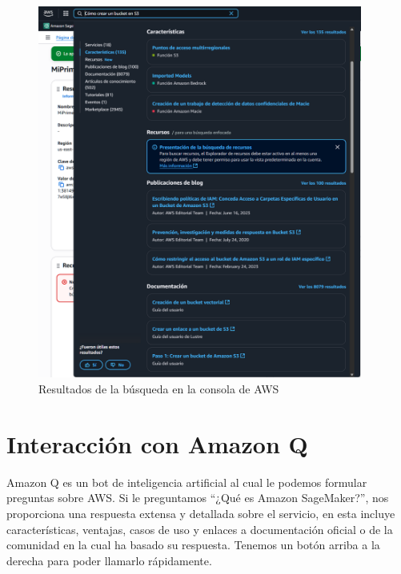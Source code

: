 \documentclass{article}
\begin{document}
	\begin{figure}[h!]
	\centering
	\includegraphics[width=0.95\textwidth]{tarea_5.png}
	\caption{Resultados de la búsqueda en la consola de AWS}
	\end{figure}

	\newpage

	\section{Interacción con Amazon Q}

	Amazon Q es un bot de inteligencia artificial al cual le podemos formular preguntas sobre AWS. Si le preguntamos ``¿Qué es Amazon SageMaker?'', nos proporciona una respuesta extensa y detallada sobre el servicio, en esta incluye características, ventajas, casos de uso y enlaces a documentación oficial o de la comunidad en la cual ha basado su respuesta. Tenemos un botón arriba a la derecha para poder llamarlo rápidamente.
\end{document}
